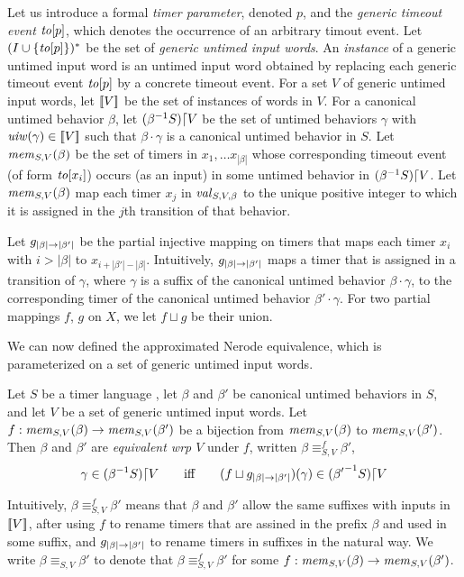 Let us introduce a formal {\em timer parameter}, denoted $p$, and the
{\em generic timeout event} $\toevent{p}$,
which denotes the occurrence of an arbitrary timout event.
Let $(I \cup \set{\toevent{p}})^*$ be the set of
{\em generic untimed input words}.
An {\em instance} of a generic untimed input word is an untimed input
word obtained by replacing each generic timeout event
$\toevent{p}$ by a concrete timeout event.
For a set $V$ of generic untimed input words, let $\instancesof{V}$ be the
set of instances of words in $V$. For a canonical untimed
behavior $\beta$, let $\suffixbehs{S}{\beta}{V}$ be the set of untimed behaviors
$\gamma$ with $\untimedinputword(\gamma) \in \instancesof{V}$ such that
$\beta\cdot\gamma$ is a canonical untimed behavior in $S$. Let
$\getmemorable{S}{\beta}{V}$ be the set of timers in
$x_1 , \ldots x_{|\beta|}$ whose corresponding timeout event
(of form $\toevent{x_i}$) occurs (as an input) in some untimed behavior in
$\suffixbehs{S}{\beta}{V}$.
Let $\getmemorable{S}{\beta}{V}$ map each timer $x_j$ in
$\getassignment{S}{\beta}{V}$ to the unique positive integer to which it
is assigned in the $j$th transition of that behavior.


Let $\suffbij{\beta}{\beta'}$ be the partial injective mapping
on timers that maps each
timer $x_i$ with $i > |\beta|$ to $x_{i + |\beta'| - |\beta|}$.
Intuitively, $\suffbij{\beta}{\beta'}$ maps a timer that is assigned 
in a transition of $\gamma$, where $\gamma$ is a suffix of the canonical
untimed behavior $\beta \cdot \gamma$, to the corresponding timer of
the canonical untimed behavior $\beta'\cdot\gamma$.
For two partial mappings $f$, $g$ on $X$, we let $f \sqcup g$ be their
union. 


We can now defined the approximated Nerode equivalence, which is parameterized
on a set of generic untimed input words.

\begin{definition}
  \label{def:approx-nerode}
Let $S$ be a timer language ,
let $\beta$ and $\beta'$ be canonical untimed behaviors in $S$,
and let  $V$ be a set of
generic untimed input words.
Let $f : \getmemorable{S}{\beta}{V} \to \getmemorable{S}{\beta'}{V}$
be a bijection
from $\getmemorable{S}{\beta}{V}$ to $\getmemorable{S}{\beta'}{V}$.
Then $\beta$ and $\beta'$ are \emph{equivalent wrp $V$} under $f$, written
$\beta \equiv_{S,V}^f \beta'$, 
\[
\gamma \in \suffixbehs{S}{\beta}{V}
\qquad \mbox{iff} \qquad
(f \sqcup \suffbij{\beta}{\beta'}) (\gamma) \in \suffixbehs{S}{\beta'}{V}
\]
\end{definition}
Intuitively, $\beta \equiv_{S,V}^f \beta'$ means that $\beta$ and $\beta'$
allow the same suffixes with inputs in $\instancesof{V}$, after using
$f$ to rename timers that are assined in the prefix $\beta$ and used in some
suffix, and $\suffbij{\beta}{\beta'}$ to rename timers in suffixes in the
natural way.
We write $\beta \equiv_{S,V} \beta'$ to denote that
$\beta \equiv_{S,V}^f \beta'$ for some
$f : \getmemorable{S}{\beta}{V} \to \getmemorable{S}{\beta'}{V}$.


